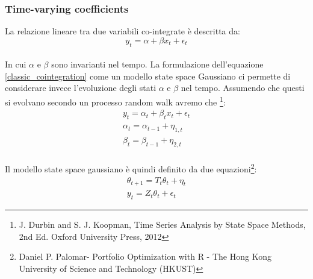 \documentclass[]{article}
\begin{document}
\subsubsection{Time-varying coefficients}
La relazione lineare tra due variabili co-integrate è descritta da:
\begin{equation}\label{classic_cointegration}
	y_t = \alpha + \beta x_t + \epsilon_t
\end{equation}
\\
In cui $\alpha$ e $\beta$ sono invarianti nel tempo.
La formulazione dell'equazione \ref{classic_cointegration} come un modello state space Gaussiano ci permette di considerare invece l'evoluzione degli stati $\alpha$ e $\beta$ nel tempo. Assumendo che questi si evolvano secondo un processo random walk avremo che \footnote{J. Durbin and S. J. Koopman, Time Series Analysis by State Space Methods, 2nd Ed. Oxford University Press, 2012}:
\begin{align}
	y_t = \alpha_t + \beta_t x_t + \epsilon_t\\
	\alpha_t = \alpha_{t-1} + \eta_{1,t}\\        
	\beta_t = \beta_{t-1} + \eta_{2,t}
\end{align}
\\
Il modello state space gaussiano è quindi definito da due equazioni\footnote{Daniel P. Palomar- Portfolio Optimization with R - The Hong Kong University of Science and Technology (HKUST)}:
\begin{align}
		\theta_{t+1}=T_t\theta_t + \eta_t\\   
		y_t = Z_t\theta_t + \epsilon_t 
\end{align}
\end{document}
